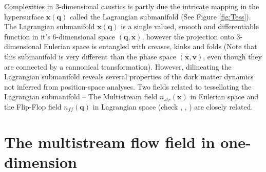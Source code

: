  
Complexities in 3-dimensional caustics is partly due the intricate mapping in the hypersurface $\mathbf{x}(\mathbf{q})$ called the Lagrangian submanifold (See Figure \ref{fig:Tess}). The Lagrangian submanifold $\mathbf{x}(\mathbf{q})$  is a single valued, smooth and differentiable function in it's 6-dimensional space $(\mathbf{q}, \mathbf{x})$, however the projection onto 3-dimensional Eulerian space is entangled with creases, kinks and folds (Note that this  submanifold is very different than the phase space $(\mathbf{x},\mathbf{v})$, even though they are connected by a cannonical transformation). However, dilineating the Lagrangian submanifold reveals several properties of the dark matter dynamics not inferred from position-space analyses. Two fields related to tessellating the Lagrangian submanifold -- The Multistream field $n_{str}(\mathbf{x})$ in Eulerian space and the Flip-Flop field $n_{ff}(\mathbf{q})$ in Lagrangian space (check \cite{Shandarin2012}, \cite{Ramachandra2015}, \cite{Shandarin2016}) are closely related. 





\section{The multistream flow field in one-dimension}
\label{appendix:nstream}

